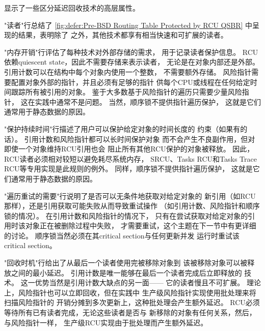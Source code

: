 显示了一些区分延迟回收技术的高层属性。

"读者"行总结了
\cref{fig:defer:Pre-BSD Routing Table Protected by RCU QSBR}
中呈现的结果，表明除了
之外，其他技术都享有相当快速和可扩展的读者。

"内存开销"行评估了每种技术对外部存储的需求，
用于记录读者保护信息。
RCU依赖quiescent state，因此不需要存储来表示读者，
无论是在对象内部还是外部。
引用计数可以在结构中每个对象内使用一个整数，
不需要额外存储。
风险指针需要配置对象外部的指针，并且必须有足够的指针
供每个CPU或线程在任何给定时间跟踪所有被引用的对象。
鉴于大多数基于风险指针的遍历只需要少量风险指针，
这在实践中通常不是问题。
当然，顺序锁不提供指针遍历保护，
这就是它们通常用于静态数据的原因。

\QuickQuizEnd

"保护持续时间"行描述了用户可以保护给定对象的时间长度的
约束（如果有的话）。
引用计数和风险指针都可以长时间保护对象
而不会产生不良副作用，但对即使一个对象维持RCU引用也会
阻止所有其他RCU保护的对象被释放。
因此，RCU读者必须相对较短以避免耗尽系统内存，
SRCU、Tasks RCU和Tasks Trace RCU等专用实现是此规则的例外。
同样，顺序锁不提供指针遍历保护，
这就是它们通常用于静态数据的原因。

"遍历重试的需要"行说明了是否可以无条件地获取对给定对象的
新引用（如RCU那样），还是引用获取可能失败从而导致重试操作
（如引用计数、风险指针和顺序锁的情况）。
在引用计数和风险指针的情况下，
只有在尝试获取对给定对象的引用时该对象正在被删除过程中失败，
才需要重试，这个主题在下一节中有更详细的讨论。
顺序锁当然必须在其critical section与任何更新并发
运行时重试该critical section。

\QuickQuizEnd

"回收时机"行给出了从最后一个读者使用完被移除对象到
该被移除对象可以被释放之间的最小延迟。
引用计数是唯一能够在最后一个读者完成后立即释放的
技术。
这一优势当然是引用计数大缺点的另一面——
它的读者慢且不可扩展。
理论上，风险指针也可以立即回收，但在实践中
生产级风险指针实现使用批处理来将扫描风险指针的
开销分摊到多次更新上，这种批处理会产生额外延迟。
RCU必须等待所有已有读者完成，无论这些读者是否与
新移除的对象有任何关系，然后，与风险指针一样，
生产级RCU实现由于批处理而产生额外延迟。

